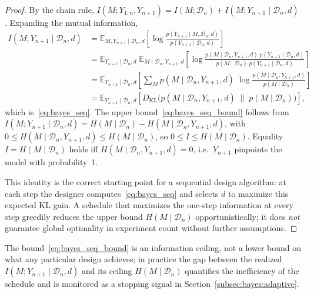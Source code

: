 \begin{proof}
By the chain rule, $I(M; Y_{1:n}, Y_{n+1} )= I(M; \mathcal{D}_n) + I(M; Y_{n+1} \mid \mathcal{D}_n, d)$. Expanding the mutual information,
{\setlength{\jot}{4pt}
\begin{align*}
I(M; Y_{n+1} \mid \mathcal{D}_n, d)
&= \mathbb{E}_{M, Y_{n+1} \mid \mathcal{D}_n, d}\!\left[
\log \frac{p(Y_{n+1} \mid M, \mathcal{D}_n, d)}
{p(Y_{n+1} \mid \mathcal{D}_n, d)}
\right] \\[4pt]
&= \mathbb{E}_{Y_{n+1} \mid \mathcal{D}_n, d}\;
\mathbb{E}_{M \mid \mathcal{D}_n, Y_{n+1}, d}\!\left[
\log \frac{p(M \mid \mathcal{D}_n, Y_{n+1}, d)\; p(Y_{n+1} \mid \mathcal{D}_n, d)}
{p(M \mid \mathcal{D}_n)\; p(Y_{n+1} \mid \mathcal{D}_n, d)}
\right] \\[4pt]
&= \mathbb{E}_{Y_{n+1} \mid \mathcal{D}_n, d}\!\left[
\sum_M p(M \mid \mathcal{D}_n, Y_{n+1}, d)\;
\log \frac{p(M \mid \mathcal{D}_n, Y_{n+1}, d)}
{p(M \mid \mathcal{D}_n)}
\right] \\[4pt]
&= \mathbb{E}_{Y_{n+1} \mid \mathcal{D}_n, d}\!\left[
D_{\mathrm{KL}}\!\bigl( p(M \mid \mathcal{D}_n, Y_{n+1}, d) \;\|\; p(M \mid \mathcal{D}_n) \bigr)
\right],
\end{align*}}
which is~\eqref{eq:bayes_seq}. The upper bound~\eqref{eq:bayes_seq_bound} follows from
$I(M; Y_{n+1} \mid \mathcal{D}_n, d) = H(M \mid \mathcal{D}_n) - H(M \mid \mathcal{D}_n, Y_{n+1}, d)$,
with $0 \le H(M \mid \mathcal{D}_n, Y_{n+1}, d) \le H(M \mid \mathcal{D}_n)$, so
$0 \le I \le H(M \mid \mathcal{D}_n)$. Equality $I = H(M \mid \mathcal{D}_n)$ holds iff
$H(M \mid \mathcal{D}_n, Y_{n+1}, d) = 0$, i.e.\ $Y_{n+1}$ pinpoints the model with probability~1.

This identity is the correct starting point for a sequential design algorithm: at each step the
designer computes~\eqref{eq:bayes_seq} and selects $d$ to maximize this expected KL gain.
A schedule that maximizes the one-step information at every step greedily reduces the upper bound
$H(M \mid \mathcal{D}_n)$ opportunistically; it does {\em not\/} guarantee global optimality in
experiment count without further assumptions.
\end{proof}

\begin{remark}
The bound~\eqref{eq:bayes_seq_bound} is an information ceiling, not a lower bound on what any particular design achieves; in practice the gap between the realized $I(M; Y_{n+1} \mid \mathcal{D}_n, d)$ and its ceiling $H(M \mid \mathcal{D}_n)$ quantifies the inefficiency of the schedule and is monitored as a stopping signal in Section~\ref{subsec:bayes:adaptive}.
\end{remark}

